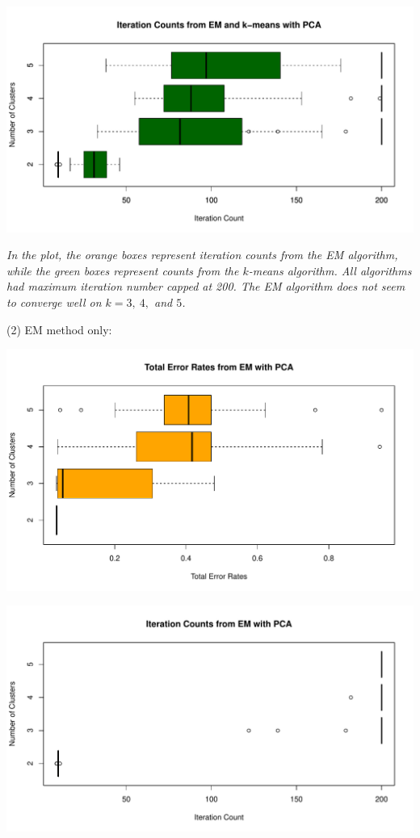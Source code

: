 \documentclass[a4paper,12pt]{article}
\begin{document}
\begin{center}
  \includegraphics[width=0.9\linewidth]{Image/Prob4-4-ItrCount-Ringnorm-Both.pdf}
  
   \parbox{0.9\textwidth}{\textit{In the plot, the \textcolor{myorange}{orange boxes} represent iteration counts from the EM algorithm, while the \textcolor{mydarkgreen}{green boxes} represent counts from the $k$-means algorithm. 
   All algorithms had maximum iteration number capped at 200. The EM algorithm does not seem to converge well on $k = 3,\ 4,$ and $5$.
  }}
\end{center}
\bigskip

\noindent (2) EM method only:
\begin{center}
  \includegraphics[width=0.8\linewidth]{Image/Prob4-4-TotalErr-Ringnorm-EMPCA.pdf}
\end{center}
\begin{center}
  \includegraphics[width=0.8\linewidth]{Image/Prob4-4-ItrCount-Ringnorm-EMPCA.pdf}
\end{center}
\bigskip
\end{document}
